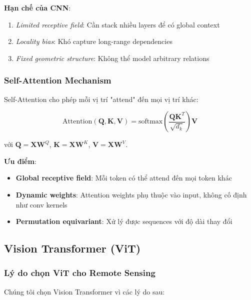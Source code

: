 \documentclass[12pt,a4paper]{article}
\begin{document}
\textbf{Hạn chế của CNN}:
\begin{enumerate}
    \item \textit{Limited receptive field}: Cần stack nhiều layers để có global context
    \item \textit{Locality bias}: Khó capture long-range dependencies
    \item \textit{Fixed geometric structure}: Không thể model arbitrary relations
\end{enumerate}

\subsubsection{Self-Attention Mechanism}

Self-Attention \cite{vaswani2017attention} cho phép mỗi vị trí "attend" đến mọi vị trí khác:

\begin{equation}
    \text{Attention}(\mathbf{Q}, \mathbf{K}, \mathbf{V}) = \text{softmax}\left(\frac{\mathbf{Q}\mathbf{K}^T}{\sqrt{d_k}}\right)\mathbf{V}
\end{equation}

với $\mathbf{Q} = \mathbf{X}\mathbf{W}^Q$, $\mathbf{K} = \mathbf{X}\mathbf{W}^K$, $\mathbf{V} = \mathbf{X}\mathbf{W}^V$.

\textbf{Ưu điểm}:
\begin{itemize}
    \item \textbf{Global receptive field}: Mỗi token có thể attend đến mọi token khác
    \item \textbf{Dynamic weights}: Attention weights phụ thuộc vào input, không cố định như conv kernels
    \item \textbf{Permutation equivariant}: Xử lý được sequences với độ dài thay đổi
\end{itemize}

\subsection{Vision Transformer (ViT)}

\subsubsection{Lý do chọn ViT cho Remote Sensing}

Chúng tôi chọn Vision Transformer \cite{dosovitskiy2021vit} vì các lý do sau:
\end{document}
